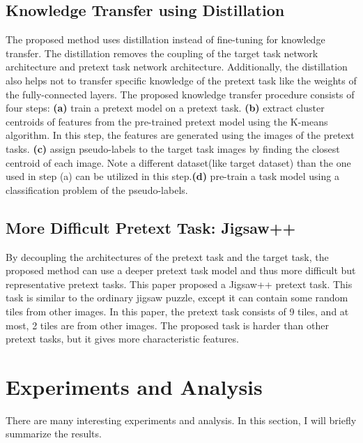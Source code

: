 \documentclass[10pt,twocolumn,letterpaper]{article}
\begin{document}
\subsection{Knowledge Transfer using Distillation}
\vspace{-0.2cm}
The proposed method uses distillation instead of fine-tuning for knowledge transfer. The distillation removes the coupling of the target task network architecture and pretext task network architecture. Additionally, the distillation also helps not to transfer specific knowledge of the pretext task like the weights of the fully-connected layers. The proposed knowledge transfer procedure consists of four steps: \textbf{(a)} train a pretext model on a pretext task. \textbf{(b)} extract cluster centroids of features from the pre-trained pretext model using the K-means algorithm. In this step, the features are generated using the images of the pretext tasks. \textbf{(c)} assign pseudo-labels to the target task images by finding the closest centroid of each image. Note a different dataset(like target dataset) than the one used in step (a) can be utilized in this step.\textbf{(d)} pre-train a task model using a classification problem of the pseudo-labels.
\vspace{-0.2cm}
\subsection{More Difficult Pretext Task: Jigsaw++}
\vspace{-0.2cm}
By decoupling the architectures of the pretext task and the target task, the proposed method can use a deeper pretext task model and thus more difficult but representative pretext tasks. This paper proposed a Jigsaw++ pretext task. This task is similar to the ordinary jigsaw puzzle, except it can contain some random tiles from other images. In this paper, the pretext task consists of 9 tiles, and at most, 2 tiles are from other images. The proposed task is harder than other pretext tasks, but it gives more characteristic features.
\vspace{-0.3cm}
\vspace{-0.3cm}
\section{Experiments and Analysis}
\vspace{-0.2cm}
There are many interesting experiments and analysis. In this section, I will briefly summarize the results.
\vspace{-0.3cm}
\end{document}
